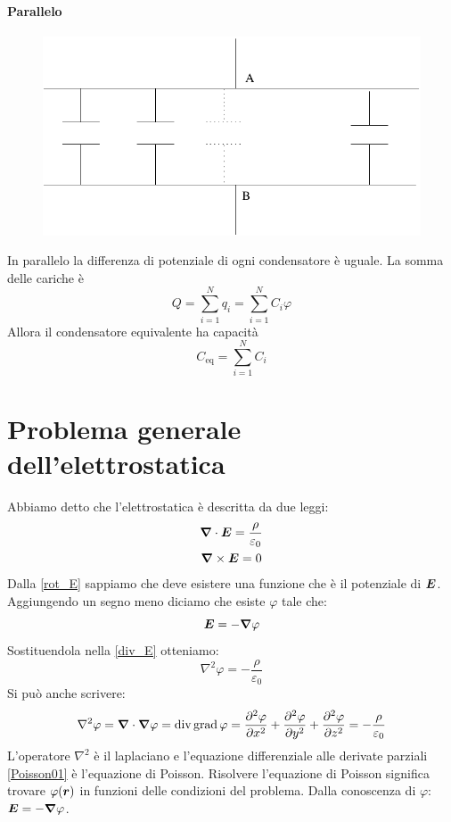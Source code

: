 \subsubsection{Parallelo}
\begin{figure}[htbp]
\centering
\includegraphics[scale=0.5]{immagini/fisica2/cond3}
\end{figure}
In parallelo la differenza di potenziale di ogni condensatore è uguale. La somma delle cariche è 
\begin{equation*}Q=\sum_{i=1}^N q_i=\sum_{i=1}^N C_i\varphi\end{equation*}
Allora il condensatore equivalente ha capacità 
\begin{equation*}C_\text{eq}=\sum_{i=1}^N C_i\end{equation*}

\chapter{Problema generale dell'elettrostatica}
\minitoc
Abbiamo detto che l'elettrostatica è descritta da due leggi:
\begin{gather}
\boldsymbol{\nabla}\cdot\boldsymbol{E}=\frac{\rho}{\varepsilon_0}
\label{div_E}\\
\boldsymbol{\nabla}\times\boldsymbol{E}=0
\label{rot_E}
\end{gather}
Dalla \eqref{rot_E} sappiamo che deve esistere una funzione che è il potenziale di $\boldsymbol{E}$. Aggiungendo un segno meno diciamo che esiste $\varphi$ tale che:
\begin{equation}
\boldsymbol{E}=-\boldsymbol{\nabla}\varphi
\end{equation}
Sostituendola nella \eqref{div_E} otteniamo:
\begin{equation}
\nabla^2\varphi=-\frac{\rho}{\varepsilon_0}
\label{Poisson01}
\end{equation}
Si può anche scrivere:
\begin{equation*}\nabla^2\varphi=\boldsymbol{\nabla}\cdot\boldsymbol{\nabla}\varphi=\operatorname{div}\operatorname{grad}\varphi={\frac{\partial^2 \varphi}{\partial x^2}+\frac{\partial^2 \varphi}{\partial y^2}+\frac{\partial^2 \varphi}{\partial z^2}}=-\frac{\rho}{\varepsilon_0}\end{equation*}
L'operatore $\nabla^2$ è il laplaciano e l'equazione differenziale alle derivate parziali \eqref{Poisson01} è l'equazione di Poisson. Risolvere l'equazione di Poisson significa trovare $\varphi(\boldsymbol{r})$ in funzioni delle condizioni del problema. Dalla conoscenza di $\varphi$: $\boldsymbol{E}=-\boldsymbol{\nabla}\varphi$.

